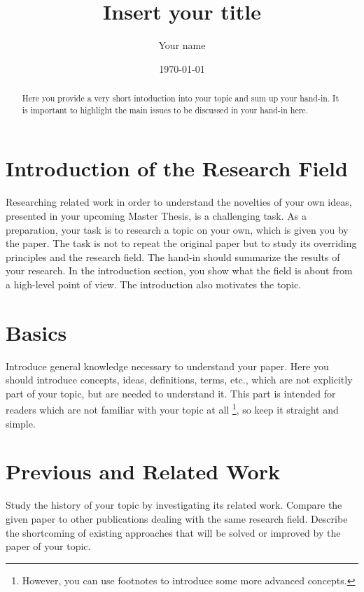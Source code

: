 \documentclass[a4paper,10pt,twoside]{article}
\title{Insert your title}
\author{Your name}
\date{\today}
\begin{document}
\maketitle

\begin{abstract}
Here you provide a very short intoduction into your topic and sum up your hand-in. 
It is important to highlight the main issues to be discussed in your hand-in here.
\end{abstract}

\tableofcontents

\section{Introduction of the Research Field}

Researching related work in order to understand the novelties of your own ideas, presented in your upcoming Master Thesis, is a challenging task. 
As a preparation, your task is to research a topic on your own, which is given you by the paper.
The task is not to repeat the original paper but to study its overriding principles and the research field.
The hand-in should summarize the results of your research.
In the introduction section, you show what the field is about from a high-level point of view.
The introduction also motivates the topic.

\section{Basics}

Introduce general knowledge necessary to understand your paper.
Here you should introduce concepts, ideas, definitions, terms, etc., which are not explicitly part of your topic, but are needed to understand it. 
This part is intended for readers which are not familiar with your topic at all
\footnote{However, you can use footnotes to introduce some more advanced concepts.}, so keep it straight and simple.

\section{Previous and Related Work}

Study the history of your topic by investigating its related work.
Compare the given paper to other publications dealing with the same research field.
Describe the shortcoming of existing approaches that will be solved or improved by the paper of your topic.
\end{document}
